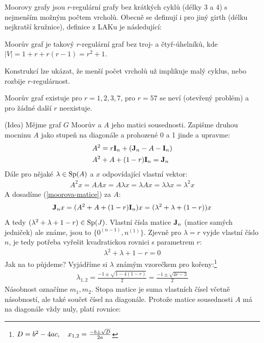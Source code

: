 Moorovy grafy jsou $r$-regulární grafy bez krátkých cyklů (délky 3 a 4) s nejmenším možným počtem vrcholů. Obecně se definují i pro jiný girth (délku nejkratší kružnice), definice z LAKu je následující:

\df Moorův graf je takový $r$-regulární graf bez troj- a čtyř-úhelníků, kde $|V| = 1 + r + r(r-1) = r^2 + 1$.

Konstrukcí lze ukázat, že menší počet vrcholů už implikuje malý cyklus, nebo rozbije $r$-regulárnost.

\vt Moorův graf existuje pro $r=1,2,3,7$, pro $r=57$ se neví (otevřený problém) a pro žádné další $r$ neexistuje.

\dk (Idea) Mějme graf $G$ Moorův a $A$ jeho matici sousednosti. Zapišme druhou 
mocninu $A$ jako stupeň na diagonále a prohozené 0 a 1 jinde a upravme:
\begin{align}
	&A^2 = r{\bf I}_n + ({\bf J}_n- A - {\bf I}_n) \\
	\label{moorova-matice}&A^2 + A + (1-r){\bf I}_n = {\bf J}_n
\end{align}
Dále pro nějaké $\lambda\in \operatorname{Sp}(A)$ a $x$ odpovídající vlastní vektor:
\begin{align}
	\label{moorova-mocnina}A^2 x = AAx = A\lambda x = \lambda A x = \lambda 
	\lambda x = \lambda^2 x
\end{align}
A dosadíme (\ref{moorova-matice}) za $A$:
\begin{align}
	{\bf J}_nx = (A^2 + A + (1-r){\bf I}_n)x = (\lambda^2 + \lambda + (1-r))x
\end{align}
A tedy $(\lambda^2 + \lambda + 1 -r) \in \operatorname{Sp}(J)$. Vlastní čísla matice ${\bf J}_n$ 
(matice samých jedniček) ale známe, jsou to $\{0^{(n-1)}, n^{(1)}\}$. Zjevně pro 
$\lambda = r$ vyjde vlastní číslo $n$, je tedy potřeba vyřešit kvadratickou 
rovnici s parametrem $r$:
\begin{align}
	\lambda^2 + \lambda + 1 - r = 0
\end{align}
Jak na to půjdeme? Vyjádříme si $\lambda$ známým vzorečkem pro kořeny:\footnote{$D=b^2-4ac,\quad x_{1,2} = {-b \pm \sqrt D \over 2a}$}
\begin{align}
	\lambda_{1,2} = \frac{-1\pm \sqrt{1-4(1-r)}}{2} = \frac{-1\pm\sqrt{4r-3}}{2}
\end{align}
Násobnost označíme $m_1, m_2$. Stopa matice je suma vlastních čísel včetně
násobností, ale také součet čísel na diagonále. Protože matice sousednosti $A$
má na diagonále vždy nuly, platí rovnice:


